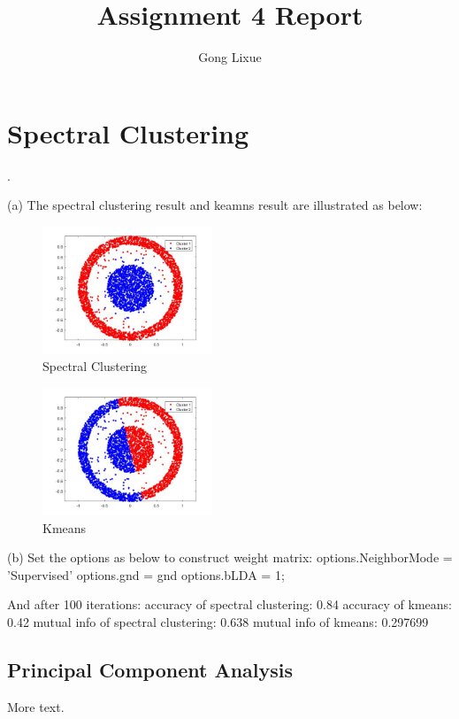 \documentclass[11pt]{article} %
\title{Assignment 4 Report}
\author{Gong Lixue}
\begin{document}
\maketitle

\section{Spectral Clustering}
.

(a)  The spectral clustering result and keamns result are illustrated as below:
\begin{figure}[h]
\centering
\includegraphics[width=2in]{spectral_cluster.jpg}  %
\caption{Spectral Clustering}
\label{fig1}
\end{figure}

\begin{figure}[h]
\centering
\includegraphics[width=2in]{kmeans.jpg}  %
\caption{Kmeans}
\label{fig1}
\end{figure}

(b) Set the options as below to construct weight matrix:
options.NeighborMode = 'Supervised'
options.gnd = gnd
options.bLDA = 1;

And after 100 iterations:
accuracy of spectral clustering: 0.84
accuracy of kmeans: 0.42
mutual info of spectral clustering: 0.638
mutual info of kmeans: 0.297699

\subsection{Principal Component Analysis}

More text.
\end{document}
